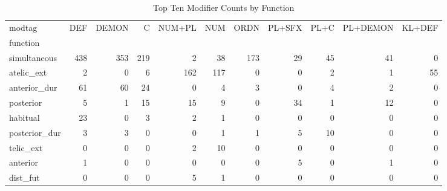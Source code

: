 \begin{table}[htbp!]
\centering
\caption{Top Ten Modifier Counts by Function}
\label{table:afmod_ct}
\begin{adjustbox}{width=1\textwidth}
\begin{tabular}{lrrrrrrrrrr}
\toprule
modtag &  DEF &  DEMON &    C &  NUM+PL &  NUM &  ORDN &  PL+SFX &  PL+C &  PL+DEMON &  KL+DEF \\
function      &      &        &      &         &      &       &         &       &           &         \\
\midrule
simultaneous  &  438 &    353 &  219 &       2 &   38 &   173 &      29 &    45 &        41 &       0 \\
atelic\_ext    &    2 &      0 &    6 &     162 &  117 &     0 &       0 &     2 &         1 &      55 \\
anterior\_dur  &   61 &     60 &   24 &       0 &    4 &     3 &       0 &     4 &         2 &       0 \\
posterior     &    5 &      1 &   15 &      15 &    9 &     0 &      34 &     1 &        12 &       0 \\
habitual      &   23 &      0 &    3 &       2 &    1 &     0 &       0 &     0 &         0 &       0 \\
posterior\_dur &    3 &      3 &    0 &       0 &    1 &     1 &       5 &    10 &         0 &       0 \\
telic\_ext     &    0 &      0 &    0 &       2 &   10 &     0 &       0 &     0 &         0 &       0 \\
anterior      &    1 &      0 &    0 &       0 &    0 &     0 &       5 &     0 &         1 &       0 \\
dist\_fut      &    0 &      0 &    0 &       5 &    1 &     0 &       0 &     0 &         0 &       0 \\
\bottomrule
\end{tabular}
\end{adjustbox}
\end{table}
